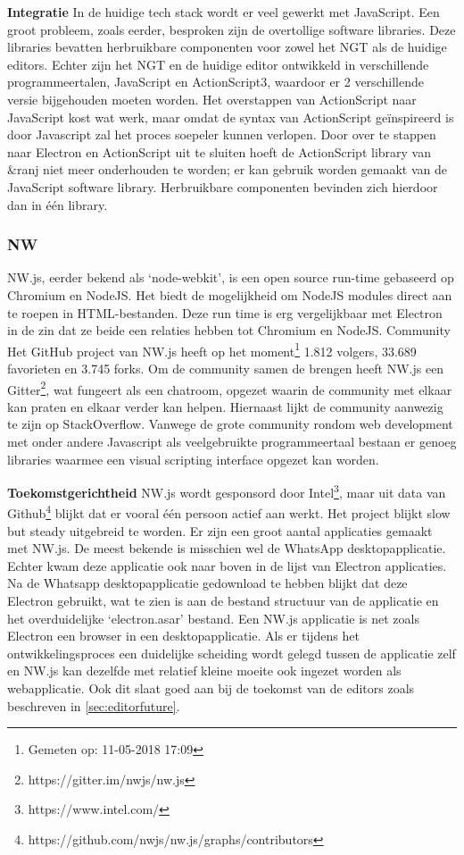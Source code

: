 \textbf{Integratie}
In de huidige tech stack wordt er veel gewerkt met JavaScript. Een groot probleem, zoals eerder, besproken zijn de overtollige software libraries. Deze libraries bevatten herbruikbare componenten voor zowel het NGT als de huidige editors. Echter zijn het NGT en de huidige editor ontwikkeld in verschillende programmeertalen, JavaScript en ActionScript3, waardoor er 2 verschillende versie bijgehouden moeten worden. Het overstappen van ActionScript naar JavaScript kost wat werk, maar omdat de syntax van ActionScript geïnspireerd is door Javascript zal het proces soepeler kunnen verlopen.
Door over te stappen naar Electron en ActionScript uit te sluiten hoeft de ActionScript library van \&ranj niet meer onderhouden te worden; er kan gebruik worden gemaakt van de JavaScript software library. Herbruikbare componenten bevinden zich hierdoor dan in één library.

\subsubsection{NW}
NW.js, eerder bekend als ‘node-webkit’, is een open source run-time gebaseerd op Chromium en NodeJS. Het biedt de mogelijkheid om NodeJS modules direct aan te roepen in HTML-bestanden. Deze run time is erg vergelijkbaar met Electron in de zin dat ze beide een relaties hebben tot Chromium en NodeJS.
Community
Het GitHub project van NW.js heeft op het moment\footnote{Gemeten op: 11-05-2018 17:09} 1.812 volgers, 33.689 favorieten en 3.745 forks\cite{NWGitHub}. Om de community samen de brengen heeft NW.js een Gitter\footnote{https://gitter.im/nwjs/nw.js}, wat fungeert als een chatroom, opgezet waarin de community met elkaar kan praten en elkaar verder kan helpen. Hiernaast lijkt de community aanwezig te zijn op StackOverflow\cite{StackOverflowNW}.
Vanwege de grote community rondom web development met onder andere Javascript als veelgebruikte programmeertaal bestaan er genoeg libraries waarmee een visual scripting interface opgezet kan worden.

\textbf{Toekomstgerichtheid}
NW.js wordt gesponsord door Intel\footnote{https://www.intel.com/}, maar uit data van Github\footnote{https://github.com/nwjs/nw.js/graphs/contributors} blijkt dat er vooral één persoon actief aan werkt. Het project blijkt slow but steady uitgebreid te worden.
Er zijn een groot aantal applicaties gemaakt met NW.js\cite{NWJSApps}. De meest bekende is misschien wel de WhatsApp desktopapplicatie. Echter kwam deze applicatie ook naar boven in de lijst van Electron applicaties. Na de Whatsapp desktopapplicatie gedownload te hebben blijkt dat deze Electron gebruikt, wat te zien is aan de bestand structuur van de applicatie en het overduidelijke ‘electron.asar’ bestand.
Een NW.js applicatie is net zoals Electron een browser in een desktopapplicatie. Als er tijdens het ontwikkelingsproces een duidelijke scheiding wordt gelegd tussen de applicatie zelf en NW.js kan dezelfde met relatief kleine moeite ook ingezet worden als webapplicatie. Ook dit slaat goed aan bij de toekomst van de editors zoals beschreven in \autoref{sec:editorfuture}.

